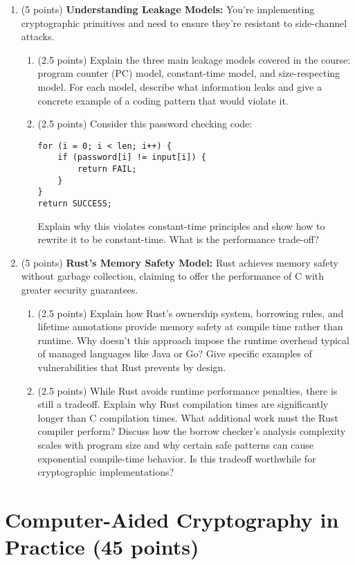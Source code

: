 \documentclass[10pt,a4paper,american]{exam}
\begin{document}
\begin{enumerate}
	\item (5 points) \textbf{Understanding Leakage Models:}
	      You're implementing cryptographic primitives and need to ensure they're resistant to side-channel attacks.
	      \begin{enumerate}
		      \item (2.5 points) Explain the three main leakage models covered in the course: program counter (PC) model, constant-time model, and size-respecting model. For each model, describe what information leaks and give a concrete example of a coding pattern that would violate it.
		      \item (2.5 points) Consider this password checking code:
		            \begin{verbatim}
for (i = 0; i < len; i++) {
    if (password[i] != input[i]) {
        return FAIL;
    }
}
return SUCCESS;
\end{verbatim}
		            Explain why this violates constant-time principles and show how to rewrite it to be constant-time. What is the performance trade-off?
	      \end{enumerate}

	\item (5 points) \textbf{Rust's Memory Safety Model:}
	      Rust achieves memory safety without garbage collection, claiming to offer the performance of C with greater security guarantees.
	      \begin{enumerate}
		      \item (2.5 points) Explain how Rust's ownership system, borrowing rules, and lifetime annotations provide memory safety at compile time rather than runtime. Why doesn't this approach impose the runtime overhead typical of managed languages like Java or Go? Give specific examples of vulnerabilities that Rust prevents by design.
		      \item (2.5 points) While Rust avoids runtime performance penalties, there is still a tradeoff. Explain why Rust compilation times are significantly longer than C compilation times. What additional work must the Rust compiler perform? Discuss how the borrow checker's analysis complexity scales with program size and why certain safe patterns can cause exponential compile-time behavior. Is this tradeoff worthwhile for cryptographic implementations?
	      \end{enumerate}
\end{enumerate}

\section{Computer-Aided Cryptography in Practice (45 points)}
\end{document}
